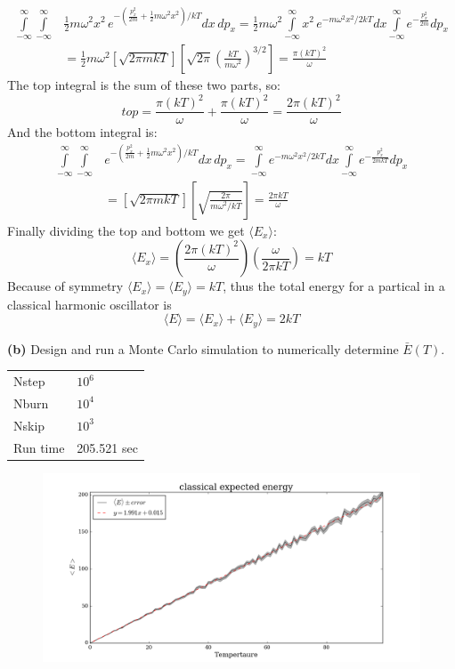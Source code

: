 \documentclass{article}
\begin{document}
\begin{align*}
	\int\limits_{-\infty}^{\infty} \int\limits_{-\infty}^{\infty} 
	& \frac{1}{2}m\omega^2 x^2 \, e^{-(\frac{p_x^2}{2m} + \frac{1}{2}m\omega^2 x^2)/kT} dx \, dp_x
	= \frac{1}{2}m\omega^2 \int\limits_{-\infty}^{\infty} x^2 \, e^{-m\omega^2 x^2/2kT} dx 
	\int\limits_{-\infty}^{\infty} e^{-\frac{p_x^2}{2m}} dp_x \\
	&= \frac{1}{2}m\omega^2 \left[ \sqrt{2\pi mkT} \right] \left[\sqrt{2\pi} \left(\frac{kT}{m\omega^2}\right)^{3/2} \right] 
	= \frac{\pi (kT)^2}{\omega}
\end{align*}
The top integral is the sum of these two parts, so: 
	\[top = \frac{\pi (kT)^2}{\omega} + \frac{\pi (kT)^2}{\omega} = \frac{2\pi (kT)^2}{\omega}\]
And the bottom integral is:
\begin{align*}
	\int\limits_{-\infty}^{\infty} \int\limits_{-\infty}^{\infty} 
	& e^{-(\frac{p_x^2}{2m} + \frac{1}{2}m\omega^2 x^2)/kT} dx \, dp_x 
	= \int\limits_{-\infty}^{\infty} e^{-m\omega^2 x^2/2kT} dx 
	\int\limits_{-\infty}^{\infty} e^{-\frac{p_x^2}{2mkT}} dp_x  \\
	&= \left[\sqrt{2\pi mkT} \right] \left[\sqrt{\frac{2\pi}{m\omega^2/kT}} \right] 
	= \frac{2\pi kT}{\omega}
\end{align*}
Finally dividing the top and bottom we get $\langle E_x \rangle$:
\[\langle E_x \rangle = \left(\frac{2\pi (kT)^2}{\omega} \right) \left(\frac{\omega}{2\pi kT} \right) = kT \]
Because of symmetry $\langle E_x \rangle = \langle E_y \rangle = kT$, thus the total energy for a partical in a classical harmonic oscillator is
\[\langle E \rangle = \langle E_x \rangle + \langle E_y \rangle = 2kT \]


\textbf{(b)} Design and run a Monte Carlo simulation to numerically determine $\bar{E}(T)$. 

\begin{table}[H]
\centering
\begin{tabular}{|l|l|}
	\hline
	Nstep    & $10^6$ \\
	Nburn    & $10^4$ \\
	Nskip    & $10^3$ \\
	Run time & 205.521 sec \\
	\hline
\end{tabular}
\end{table}

\begin{figure}[H]
\begin{center}
\includegraphics[width=16cm]{../output/classical/expected.png} 
\end{center}
\end{figure}
\end{document}
